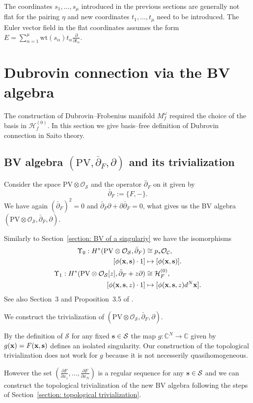 \documentclass[12pt,a4paper]{amsart}
\newcommand{\CC}{{\mathbb{C}}}
\newcommand{\bx}{{\bf x}}
\newcommand{\wt}{\mathrm{wt}}
\def\C{{\mathcal C}}
\def\H{{\mathcal H}}
\def\O{{\mathcal O}}
\renewcommand{\S}{{\mathcal S}}
\newcommand{\p}{{\partial}}
\newcommand{\<}{\left<}
\renewcommand{\>}{\right>}
\newcommand{\bs}{{\bf s}}
\newcommand{\PV}{{\mathrm{PV}}}
\numberwithin{equation}{section}
\begin{document}
The coordinates $s_1,\dots,s_\mu$ introduced in the previous sections are generally not flat for the pairing $\eta$ and new coordinates $t_1,\dots,t_\mu$ need to be introduced. The Euler vector field in the flat coordinates assumes the form $E = \sum_{\alpha=1}^\mu \wt(s_\alpha) t_\alpha \frac{\p}{\p t_\alpha}$.

\section{Dubrovin connection via the BV algebra}
The construction of Dubrovin--Frobenius manifold $M_f^\omega$ required the choice of the basis in $\H_f^{(0)}$.
In this section we give basis--free definition of Dubrovin connection in Saito theory.

\subsection{BV algebra $(\PV,\overline \p_F, \p)$ and its trivialization}

Consider the space $\PV \otimes \O_\S$ and the operator $\bar\p_F$  on it given by
\[
    \bar \p_F := \lbrace F, - \rbrace.
\]
We have again $(\bar \p_F)^2 = 0$ and $\bar\p_F \p + \p \bar\p_F = 0$, what gives us
the BV algebra $(\PV \otimes \O_\S, \bar \p_F, \p)$.

Similarly to Section~\ref{section: BV of a singulariy} we have the isomorphisms
\begin{align}
    \Upsilon_0: H^\ast(\PV\otimes\O_\S, \bar \p_F) & \cong p_\ast \O_\C,
    \label{eq: HPV to OC iso}
    \\
    \notag
    [\phi(\bx,\bs) \cdot 1 ] & \mapsto [\phi(\bx,\bs)].
    \\
    \Upsilon_1: H^\ast(\PV \otimes \O_\S[z], \bar \p_F + z\p) & \cong \H_F^{(0)},
    \label{eq: HPV to HF iso}
    \\
\notag
    [\phi(\bx,\bs,z) \cdot 1] & \mapsto [\phi(\bx,\bs,z) d^N\bx].
\end{align}
See also Section~3 and Proposition~3.5 of \cite{LLS}.

We construct the trivialization of $(\PV \otimes \O_\S, \bar \p_F, \p)$.

By the definition of $\S$ for any fixed $\bs \in \S$ the map $g: \CC^N \to \CC$ given by $g(\bx) = F(\bx,\bs)$ defines an isolated singularity. Our construction of the topological trivialization does not work for $g$ because it is not necesserily quasihomogeneous.

However the set $(\frac{\p F}{\p x_1},\dots, \frac{\p F}{\p x_N})$ is a regular sequence for any $\bs \in \S$ and we can construct the topological trivialization of the new BV algebra following the steps of Section~\ref{section: topological trivialization}.
\end{document}
